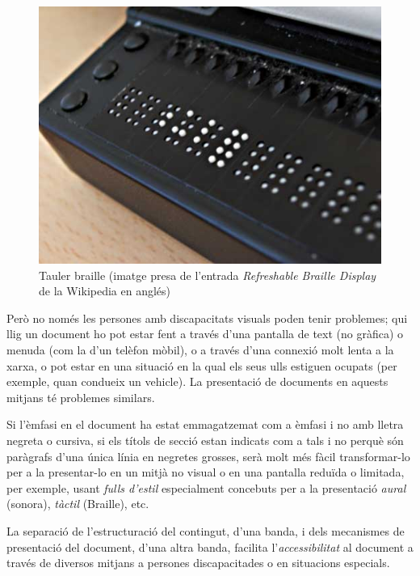 \begin{figure}
  \centering
  \includegraphics[scale=0.5]{Refreshable_Braille_display.jpg}
  \caption{Tauler braille (imatge presa de l'entrada \emph{Refreshable Braille Display} de la Wikipedia en anglés)}
\end{figure}

Però no només les persones amb discapacitats visuals poden tenir
problemes; qui llig un document ho pot estar fent a través d'una
pantalla de text (no gràfica) o menuda (com la d'un telèfon mòbil), o
a través d'una connexió molt lenta a la xarxa, o pot estar en una
situació en la qual els seus ulls estiguen ocupats (per exemple, quan
condueix un vehicle). La presentació de documents en aquests mitjans
té problemes similars.

Si l'èmfasi en el document ha estat emmagatzemat com a èmfasi i no amb
lletra negreta o cursiva, si els títols de secció estan indicats com a
tals i no perquè són paràgrafs d'una única línia en negretes grosses,
serà molt més fàcil transformar-lo per a la presentar-lo en un mitjà
no visual o en una pantalla reduïda o limitada, per exemple, usant
\emph{fulls d'estil} especialment concebuts per a la presentació
\emph{aural} (sonora), \emph{tàctil} (Braille), etc.

La separació de l'estructuració del contingut, d'una banda, i dels
mecanismes de presentació del document, d'una altra banda, facilita
l'\emph{accessibilitat} al document a través de diversos mitjans a
persones discapacitades o en situacions especials.



